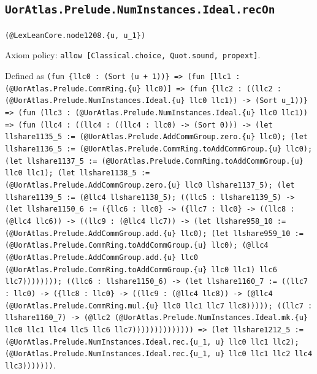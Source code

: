 \documentclass[11pt]{article}
\begin{document}
\subsection*{\texttt{UorAtlas.Prelude.NumInstances.Ideal.recOn}}
\noindent\texttt{(@LexLeanCore.node1208.\{u, u\_1\})}\par
\noindent Axiom policy: \texttt{allow [Classical.choice, Quot.sound, propext]}.\par
\noindent Defined as \texttt{(fun \{llc0 : (Sort (u + 1))\} => (fun [llc1 : (@UorAtlas.Prelude.CommRing.\{u\} llc0)] => (fun \{llc2 : ((llc2 : (@UorAtlas.Prelude.NumInstances.Ideal.\{u\} llc0 llc1)) -> (Sort u\_1))\} => (fun (llc3 : (@UorAtlas.Prelude.NumInstances.Ideal.\{u\} llc0 llc1)) => (fun (llc4 : ((llc4 : ((llc4 : llc0) -> (Sort 0))) -> (let llshare1135\_5 := (@UorAtlas.Prelude.AddCommGroup.zero.\{u\} llc0); (let llshare1136\_5 := (@UorAtlas.Prelude.CommRing.toAddCommGroup.\{u\} llc0); (let llshare1137\_5 := (@UorAtlas.Prelude.CommRing.toAddCommGroup.\{u\} llc0 llc1); (let llshare1138\_5 := (@UorAtlas.Prelude.AddCommGroup.zero.\{u\} llc0 llshare1137\_5); (let llshare1139\_5 := (@llc4 llshare1138\_5); ((llc5 : llshare1139\_5) -> (let llshare1150\_6 := (\{llc6 : llc0\} -> (\{llc7 : llc0\} -> ((llc8 : (@llc4 llc6)) -> ((llc9 : (@llc4 llc7)) -> (let llshare958\_10 := (@UorAtlas.Prelude.AddCommGroup.add.\{u\} llc0); (let llshare959\_10 := (@UorAtlas.Prelude.CommRing.toAddCommGroup.\{u\} llc0); (@llc4 (@UorAtlas.Prelude.AddCommGroup.add.\{u\} llc0 (@UorAtlas.Prelude.CommRing.toAddCommGroup.\{u\} llc0 llc1) llc6 llc7)))))))); ((llc6 : llshare1150\_6) -> (let llshare1160\_7 := ((llc7 : llc0) -> (\{llc8 : llc0\} -> ((llc9 : (@llc4 llc8)) -> (@llc4 (@UorAtlas.Prelude.CommRing.mul.\{u\} llc0 llc1 llc7 llc8))))); ((llc7 : llshare1160\_7) -> (@llc2 (@UorAtlas.Prelude.NumInstances.Ideal.mk.\{u\} llc0 llc1 llc4 llc5 llc6 llc7)))))))))))))) => (let llshare1212\_5 := (@UorAtlas.Prelude.NumInstances.Ideal.rec.\{u\_1, u\} llc0 llc1 llc2); (@UorAtlas.Prelude.NumInstances.Ideal.rec.\{u\_1, u\} llc0 llc1 llc2 llc4 llc3)))))))}.\par
\end{document}
